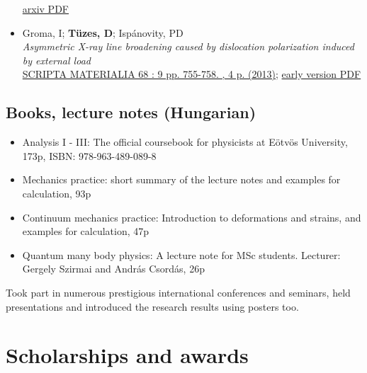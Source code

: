 \documentclass[10pt,USletter,sans]{moderncv}        %
\begin{document}
\begin{itemize}
    \href{https://arxiv.org/pdf/1604.01645}{arxiv PDF}
\item Groma, I; \textbf{Tüzes, D}; Ispánovity, PD\\
    \emph{Asymmetric X-ray line broadening caused by dislocation polarization induced by external load}\\
    \href{https://www.sciencedirect.com/science/article/pii/S1359646213000110}{SCRIPTA MATERIALIA 68 : 9 pp. 755-758. , 4 p. (2013)}; \href{http://metal.elte.hu/~tuzes/docs/pre\%20AsymmetricX-ray\%20line\%20broadening\%20caused\%20by\%20dislocation\%20polarization\%20induced\%20by\%20external\%20load.pdf}{early version PDF}
\end{itemize}
    
\subsection{Books, lecture notes (Hungarian)}
\begin{itemize}
\item Analysis I - III: The official coursebook for physicists at Eötvös University, 173p, ISBN: 978-963-489-089-8
\item Mechanics practice: short summary of the lecture notes and examples for calculation, 93p
\item Continuum mechanics practice: Introduction to deformations and strains, and examples for calculation, 47p
\item Quantum many body physics: A lecture note for MSc students. Lecturer: Gergely Szirmai and András Csordás, 26p
\end{itemize}
\vspace{6pt}
Took part in numerous prestigious international conferences and seminars, held presentations and introduced the research results using posters too. 

\section{Scholarships and awards}
\end{document}
